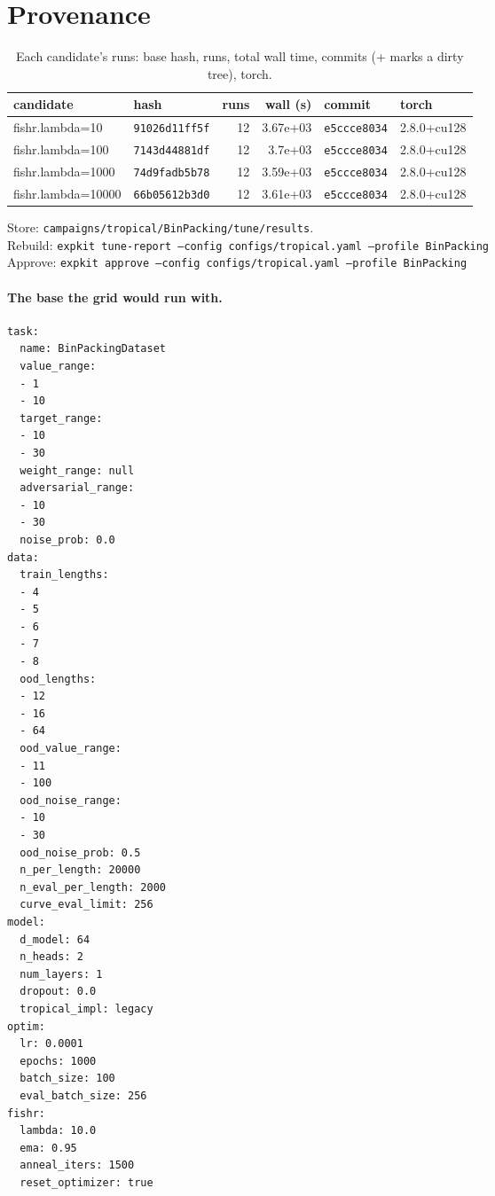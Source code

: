 \documentclass[10pt]{article}
\begin{document}
\section{Provenance}
{\small
\begin{longtable}{llrrll}
\caption{Each candidate's runs: base hash, runs, total wall time, commits (+ marks a dirty tree), torch.}\label{tab:provenance}\\
\toprule
candidate & hash & runs & wall (s) & commit & torch\\
\midrule
\endhead
fishr.lambda=10 & \texttt{91026d11ff5f} & 12 & 3.67e+03 & \texttt{e5ccce8034} & 2.8.0+cu128\\
fishr.lambda=100 & \texttt{7143d44881df} & 12 & 3.7e+03 & \texttt{e5ccce8034} & 2.8.0+cu128\\
fishr.lambda=1000 & \texttt{74d9fadb5b78} & 12 & 3.59e+03 & \texttt{e5ccce8034} & 2.8.0+cu128\\
fishr.lambda=10000 & \texttt{66b05612b3d0} & 12 & 3.61e+03 & \texttt{e5ccce8034} & 2.8.0+cu128\\
\bottomrule
\end{longtable}
}
\noindent Store: \texttt{campaigns/tropical/BinPacking/tune/results}.\\
Rebuild: \texttt{expkit tune-report --config configs/tropical.yaml --profile BinPacking}\\
Approve: \texttt{expkit approve --config configs/tropical.yaml --profile BinPacking}

\paragraph{The base the grid would run with.}
{\footnotesize
\begin{verbatim}
task:
  name: BinPackingDataset
  value_range:
  - 1
  - 10
  target_range:
  - 10
  - 30
  weight_range: null
  adversarial_range:
  - 10
  - 30
  noise_prob: 0.0
data:
  train_lengths:
  - 4
  - 5
  - 6
  - 7
  - 8
  ood_lengths:
  - 12
  - 16
  - 64
  ood_value_range:
  - 11
  - 100
  ood_noise_range:
  - 10
  - 30
  ood_noise_prob: 0.5
  n_per_length: 20000
  n_eval_per_length: 2000
  curve_eval_limit: 256
model:
  d_model: 64
  n_heads: 2
  num_layers: 1
  dropout: 0.0
  tropical_impl: legacy
optim:
  lr: 0.0001
  epochs: 1000
  batch_size: 100
  eval_batch_size: 256
fishr:
  lambda: 10.0
  ema: 0.95
  anneal_iters: 1500
  reset_optimizer: true
\end{verbatim}
}

\clearpage
\appendix
\end{document}
